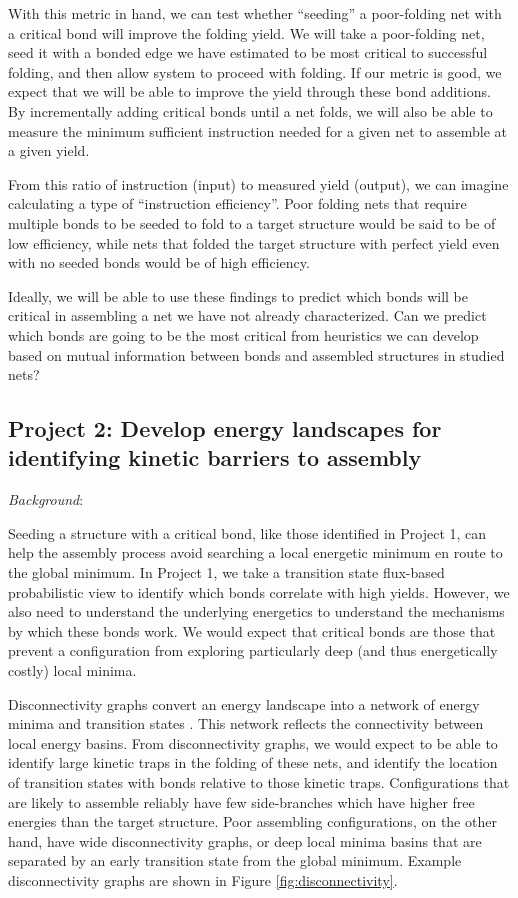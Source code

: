 With this metric in hand, we can test whether ``seeding'' a poor-folding net with a critical bond will improve the folding yield.
We will take a poor-folding net, seed it with a bonded edge we have estimated to be most critical to successful folding, and then allow system to proceed with folding.
If our metric is good, we expect that we will be able to improve the yield through these bond additions.
By incrementally adding critical bonds until a net folds, we will also be able to measure the minimum sufficient instruction needed for a given net to assemble at a given yield.

From this ratio of instruction (input) to measured yield (output), we can imagine calculating a type of ``instruction efficiency''.
Poor folding nets that require multiple bonds to be seeded to fold to a target structure would be said to be of low efficiency, while nets that folded the target structure with perfect yield even with no seeded bonds would be of high efficiency.

Ideally, we will be able to use these findings to predict which bonds will be critical in assembling a net we have not already characterized.
Can we predict which bonds are going to be the most critical from heuristics we can develop based on mutual information between bonds and assembled structures in studied nets?



\subsection*{Project 2: Develop energy landscapes for identifying kinetic barriers to assembly}

\textit{Background}:

Seeding a structure with a critical bond, like those identified in Project 1, can help the assembly process avoid searching a local energetic minimum en route to the global minimum.
In Project 1, we take a transition state flux-based probabilistic view to identify which bonds correlate with high yields.
However, we also need to understand the underlying energetics to understand the mechanisms by which these bonds work.
We would expect that critical bonds are those that prevent a configuration from exploring particularly deep (and thus energetically costly) local minima.

Disconnectivity graphs convert an energy landscape into a network of energy minima and transition states \cite{Smeeton_2014_JCompChem,Becker_1997_JChemPhys,Wales_2017_JChemPhys,Wales_2006_JChemPhysB}.
This network reflects the connectivity between local energy basins.
From disconnectivity graphs, we would expect to be able to identify large kinetic traps in the folding of these nets, and identify the location of transition states with bonds relative to those kinetic traps.
Configurations that are likely to assemble reliably have few side-branches which have higher free energies than the target structure.
Poor assembling configurations, on the other hand, have wide disconnectivity graphs, or deep local minima basins that are separated by an early transition state from the global minimum.
Example disconnectivity graphs are shown in Figure \ref{fig:disconnectivity}.



